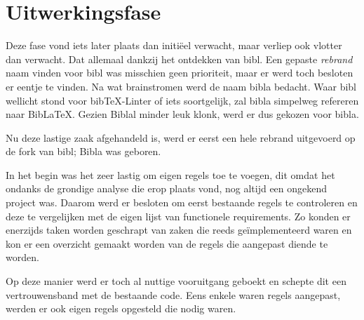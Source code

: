 \chapter{Uitwerkingsfase}
\label{ch:uitwerkingsfase}


Deze fase vond iets later plaats dan initiëel verwacht, maar verliep ook vlotter dan verwacht. Dat allemaal dankzij het ontdekken van bibl. Een gepaste \emph{rebrand} naam vinden voor bibl was misschien geen prioriteit, maar er werd toch besloten er eentje te vinden. Na wat brainstromen werd de naam bibla bedacht. Waar bibl wellicht stond voor bibTeX-Linter of iets soortgelijk, zal bibla simpelweg refereren naar BibLaTeX. Gezien Biblal minder leuk klonk, werd er dus gekozen voor bibla.

Nu deze lastige zaak afgehandeld is, werd er eerst een hele rebrand uitgevoerd op de fork van bibl; Bibla was geboren.

In het begin was het zeer lastig om eigen regels toe te voegen, dit omdat het ondanks de grondige analyse die erop plaats vond, nog altijd een ongekend project was. Daarom werd er besloten om eerst bestaande regels te controleren en deze te vergelijken met de eigen lijst van functionele requirements.
Zo konden er enerzijds taken worden geschrapt van zaken die reeds geïmplementeerd waren en kon er een overzicht gemaakt worden van de regels die aangepast diende te worden. 

Op deze manier werd er toch al nuttige vooruitgang geboekt en schepte dit een vertrouwensband met de bestaande code. Eens enkele waren regels aangepast, werden er ook eigen regels opgesteld die nodig waren.
